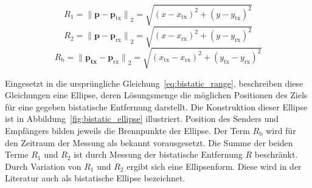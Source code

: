 \begin{equation}
    R_1 = {\lVert \boldsymbol{p} - \boldsymbol{p}_\text{tx} \rVert}_2 = \sqrt{{(x - x_\text{tx})}^2 + {(y - y_\text{tx})}^2}
\end{equation}
\begin{equation}
    R_2 = {\lVert \boldsymbol{p} - \boldsymbol{p}_\text{rx} \rVert}_2 = \sqrt{{(x - x_\text{rx})}^2 + {(y - y_\text{rx})}^2}
\end{equation}
\begin{equation}
    R_\text{b} = {\lVert \boldsymbol{p_\text{tx}} - \boldsymbol{p}_\text{rx} \rVert}_2 = \sqrt{{(x_\text{tx} - x_\text{rx})}^2 + {(y_\text{tx} - y_\text{rx})}^2}
\end{equation}

Eingesetzt in die ursprüngliche Gleichung~\ref{eq:bistatic_range}, beschreiben diese Gleichungen eine Ellipse, deren Lösungsmenge die möglichen Positionen des Ziels für eine gegeben bistatische Entfernung darstellt. Die Konstruktion dieser Ellipse ist in Abbildung~\ref{fig:bistatic_ellipse} illustriert. Position des Senders und Empfängers bilden jeweils die Brennpunkte der Ellipse. Der Term \(R_\text{b}\) wird für den Zeitraum der Messung als bekannt vorausgesetzt. Die Summe der beiden Terme \(R_1\) und \(R_2\) ist durch Messung der bistatische Entfernung \(R\) beschränkt. Durch Variation von \(R_1\) und \(R_2\) ergibt sich eine Ellipsenform. Diese wird in der Literatur auch als bistatische Ellipse bezeichnet.

